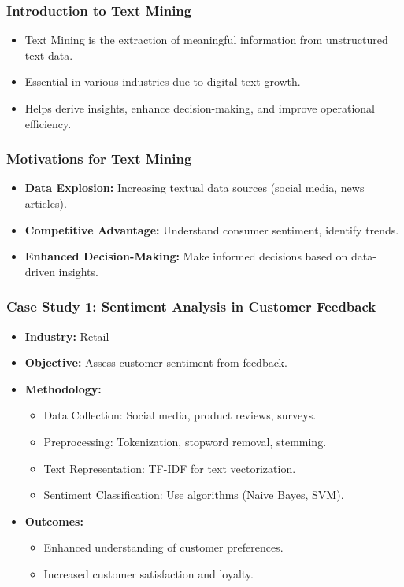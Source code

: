 \documentclass[aspectratio=169]{beamer}
\begin{document}
\begin{frame}[fragile]
  \frametitle{Introduction to Text Mining}
  \begin{itemize}
    \item Text Mining is the extraction of meaningful information from unstructured text data.
    \item Essential in various industries due to digital text growth.
    \item Helps derive insights, enhance decision-making, and improve operational efficiency.
  \end{itemize}
\end{frame}

\begin{frame}[fragile]
  \frametitle{Motivations for Text Mining}
  \begin{itemize}
    \item \textbf{Data Explosion:} Increasing textual data sources (social media, news articles).
    \item \textbf{Competitive Advantage:} Understand consumer sentiment, identify trends.
    \item \textbf{Enhanced Decision-Making:} Make informed decisions based on data-driven insights.
  \end{itemize}
\end{frame}

\begin{frame}[fragile]
  \frametitle{Case Study 1: Sentiment Analysis in Customer Feedback}
  \begin{itemize}
    \item \textbf{Industry:} Retail
    \item \textbf{Objective:} Assess customer sentiment from feedback.
    \item \textbf{Methodology:}
      \begin{itemize}
        \item Data Collection: Social media, product reviews, surveys.
        \item Preprocessing: Tokenization, stopword removal, stemming.
        \item Text Representation: TF-IDF for text vectorization.
        \item Sentiment Classification: Use algorithms (Naive Bayes, SVM).
      \end{itemize}
    \item \textbf{Outcomes:}
      \begin{itemize}
        \item Enhanced understanding of customer preferences.
        \item Increased customer satisfaction and loyalty.
      \end{itemize}
  \end{itemize}
\end{frame}
\end{document}
